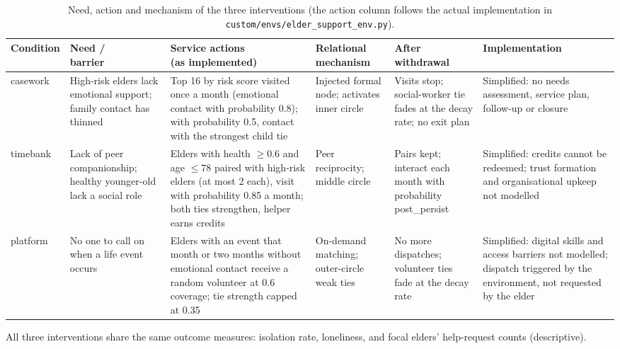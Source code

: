 \documentclass[10pt,twocolumn]{article}
\begin{document}
\begin{table}[t]
\centering\small
\caption{Need, action and mechanism of the three interventions (the action column follows the actual implementation in \texttt{custom/envs/elder\_support\_env.py}).}
\label{tab:mechanism}
\setlength{\tabcolsep}{4pt}
\begin{tabular}{@{}>{\raggedright\arraybackslash}p{}>{\raggedright\arraybackslash}p{}>{\raggedright\arraybackslash}p{}>{\raggedright\arraybackslash}p{}>{\raggedright\arraybackslash}p{}>{\raggedright\arraybackslash}p{}@{}}
\toprule
Condition & \shortstack{Need /\\ barrier} & \shortstack{Service actions\\ (as implemented)} & \shortstack{Relational\\ mechanism} & \shortstack{After\\ withdrawal} & Implementation \\
\midrule
casework & High-risk elders lack emotional support; family contact has thinned & Top 16 by risk score visited once a month (emotional contact with probability 0.8); with probability 0.5, contact with the strongest child tie & Injected formal node; activates inner circle & Visits stop; social-worker tie fades at the decay rate; no exit plan & Simplified: no needs assessment, service plan, follow-up or closure \\
timebank & Lack of peer companionship; healthy younger-old lack a social role & Elders with health $\ge0.6$ and age $\le78$ paired with high-risk elders (at most 2 each), visit with probability 0.85 a month; both ties strengthen, helper earns credits & Peer reciprocity; middle circle & Pairs kept; interact each month with probability post\_persist & Simplified: credits cannot be redeemed; trust formation and organisational upkeep not modelled \\
platform & No one to call on when a life event occurs & Elders with an event that month or two months without emotional contact receive a random volunteer at 0.6 coverage; tie strength capped at 0.35 & On-demand matching; outer-circle weak ties & No more dispatches; volunteer ties fade at the decay rate & Simplified: digital skills and access barriers not modelled; dispatch triggered by the environment, not requested by the elder \\
\bottomrule
\end{tabular}
\smallskip

{\footnotesize All three interventions share the same outcome measures: isolation rate, loneliness, and focal elders' help-request counts (descriptive).}
\end{table}
\end{document}
